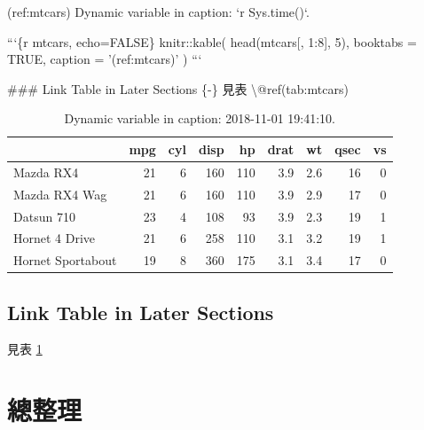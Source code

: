 \documentclass[oneside]{book}
\newenvironment{Shaded}{\begin{snugshade}}{\end{snugshade}}
\newcommand{\BaseNTok}[1]{\textcolor[rgb]{0.00,0.00,0.81}{#1}}
\newcommand{\FunctionTok}[1]{\textcolor[rgb]{0.00,0.00,0.00}{#1}}
\newcommand{\NormalTok}[1]{#1}
\theoremstyle{definition}
\theoremstyle{definition}
\theoremstyle{definition}
\theoremstyle{remark}
\begin{document}
\begin{Shaded}
\begin{Highlighting}[]
\NormalTok{(ref:mtcars) Dynamic variable in caption: }\BaseNTok{`r Sys.time()`}\NormalTok{.}

\NormalTok{```\{r mtcars, echo=FALSE\}}
\NormalTok{knitr::kable(}
\NormalTok{  head(mtcars[, 1:8], 5), booktabs = TRUE,}
\NormalTok{  caption = '(ref:mtcars)'}
\NormalTok{  )}
\NormalTok{```}

\FunctionTok{### Link Table in Later Sections \{-\}}
\NormalTok{見表 \textbackslash{}@ref(tab:mtcars)}
\end{Highlighting}
\end{Shaded}



\begin{table}[t]

\caption{\label{tab:mtcar}Dynamic variable in caption: 2018-11-01 19:41:10.}
\centering
\begin{tabular}{lrrrrrrrr}
\toprule
  & mpg & cyl & disp & hp & drat & wt & qsec & vs\\
\midrule
Mazda RX4 & 21 & 6 & 160 & 110 & 3.9 & 2.6 & 16 & 0\\
Mazda RX4 Wag & 21 & 6 & 160 & 110 & 3.9 & 2.9 & 17 & 0\\
Datsun 710 & 23 & 4 & 108 & 93 & 3.9 & 2.3 & 19 & 1\\
Hornet 4 Drive & 21 & 6 & 258 & 110 & 3.1 & 3.2 & 19 & 1\\
Hornet Sportabout & 19 & 8 & 360 & 175 & 3.1 & 3.4 & 17 & 0\\
\bottomrule
\end{tabular}
\end{table}

\subsection*{Link Table in Later
Sections}\label{link-table-in-later-sections}

見表 \ref{tab:mtcar}

\section{總整理}
\end{document}
